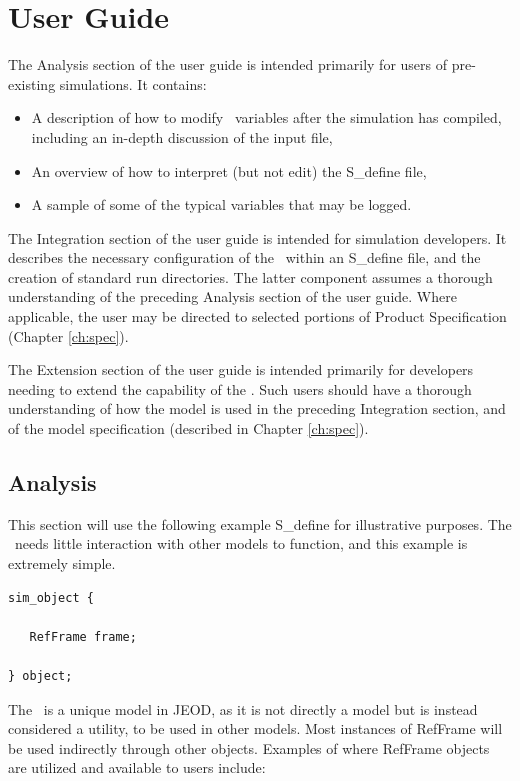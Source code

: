 \chapter{User Guide}\label{ch:user}
The Analysis section of the user guide is intended primarily for users of pre-existing simulations.
It contains:
\begin{itemize}
\item A description of how to modify \ variables after the simulation
has compiled, including an in-depth discussion of the input file,
\item An overview of how to interpret (but not edit) the S\_define file,
\item A sample of some of the typical variables that may be logged.
\end{itemize}

The Integration section of the user guide is intended for simulation developers.
It describes the necessary configuration of the \ within an
S\_define file, and the creation of standard run directories.  The latter
component assumes a thorough understanding of the preceding Analysis section of the user guide.
Where applicable, the user may be directed to selected portions of Product Specification (Chapter \ref{ch:spec}).

The Extension section of the user guide is intended primarily for developers
needing to extend the capability of the .  Such users should have a
thorough understanding of how the model is used in the preceding
Integration section, and of the model
specification (described in Chapter \ref{ch:spec}).

\section{Analysis}

This section will use the following example S\_define for illustrative
purposes. The \ needs little interaction with other
models to function, and this example is extremely simple.

\begin{verbatim}
sim_object {

   RefFrame frame;

} object;
\end{verbatim}

The \ is a unique model in JEOD, as it is not directly a model
but is instead considered a utility, to be used in other models.
Most instances of RefFrame will be used indirectly through other
objects. Examples of where RefFrame objects are utilized and available to
users include:

